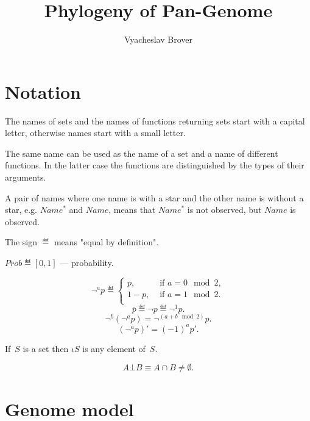 \documentclass[10pt,a4paper]{article}
\title{Phylogeny of Pan-Genome}
\author{Vyacheslav Brover}
\theoremstyle{plain} \newtheorem{Lem}{Lemma}
\begin{document}
\maketitle

\tableofcontents


\section{Notation}
The names of sets and the names of functions returning sets start with a capital letter, otherwise names start with a small letter.

The same name can be used as the name of a set and a name of different functions.
In the latter case the functions are distinguished by the types of their arguments.

A pair of names where one name is with a star and the other name is without a star, e.g. $Name^*$ and $Name$, means that $Name^*$ is not observed, but $Name$ is observed.

The sign $\eqdef$ means "equal by definition".

$ Prob \eqdef [0,1] $ --- probability.

\begin{equation*}
\neg^a p \eqdef
  \begin{cases}
    p,          &\text{ if } a = 0 \mod 2,\\
    1-p,        &\text{ if } a = 1 \mod 2.\\
  \end{cases}
\end{equation*}
$$ \bar p \eqdef \neg p \eqdef \neg^1 p. $$
$$ \neg^b (\neg^a p) = \neg^{(a+b\mod 2)} p. $$
$$ (\neg^a p)' = (-1)^a p'. $$

If~$S$ is a set then $\iota S$ is any element of~$S$.

$$ A \bot B \equiv A \cap B \ne \emptyset. $$


\section {Genome model}
\end{document}

